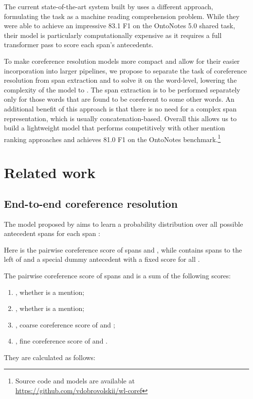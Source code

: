 \documentclass[11pt]{article}
\begin{document}
The current state-of-the-art system built by \citet{wu-etal-2020-corefqa} uses a different approach, formulating the task as a machine reading comprehension problem. While they were able to achieve an impressive 83.1 F1 on the OntoNotes 5.0 shared task, their model is particularly computationally expensive as it requires a full transformer pass to score each span's antecedents.

To make coreference resolution models more compact and allow for their easier incorporation into larger pipelines, we propose to separate the task of coreference resolution from span extraction and to solve it on the word-level, lowering the complexity of the model to . The span extraction is to be performed separately only for those words that are found to be coreferent to some other words. An additional benefit of this approach is that there is no need for a complex span representation, which is usually concatenation-based. Overall this allows us to build a lightweight model that performs competitively with other mention ranking approaches and achieves 81.0 F1 on the OntoNotes benchmark.\footnote{Source code and models are available at \url{https://github.com/vdobrovolskii/wl-coref}}

\section{Related work}
\subsection{End-to-end coreference resolution}
The model proposed by \citet{lee-etal-2018-higher} aims to learn a probability distribution  over all possible antecedent spans  for each span :

Here  is the pairwise coreference score of spans  and , while  contains spans to the left of  and a special dummy antecedent  with a fixed score  for all .

The pairwise coreference score  of spans  and  is a sum of the following scores:
\begin{enumerate}
    \item , whether  is a mention;
    \item , whether  is a mention;
    \item , coarse coreference score of  and ;
    \item , fine coreference score of  and .
\end{enumerate}
They are calculated as follows:
\end{document}
